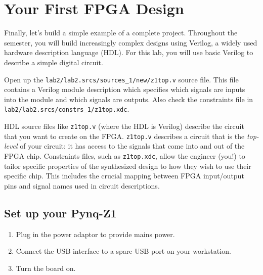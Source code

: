 \documentclass[11pt]{article}
\begin{document}
\section{Your First FPGA Design}
Finally, let's build a simple example of a complete project. Throughout the semester, you will build increasingly complex designs using Verilog, a widely used hardware description language (HDL). For this lab, you will use basic Verilog to describe a simple digital circuit.

Open up the \verb|lab2/lab2.srcs/sources_1/new/z1top.v| source file.
This file contains a Verilog module description which specifies which signals are inputs into the module and which signals are outputs.
Also check the constraints file in \verb|lab2/lab2.srcs/constrs_1/z1top.xdc|.



HDL source files like \verb|z1top.v| (where the HDL is Verilog) describe the circuit that you want to create on the FPGA.
\verb|z1top.v| describes a circuit that is the \emph{top-level} of your circuit: it has access to the signals that come into and out of the FPGA chip.
Constraints files, such as \verb|z1top.xdc|, allow the engineer (you!) to tailor specific properties of the synthesized design to how they wish to use their specific chip. This includes the crucial mapping between FPGA input/output pins and signal names used in circuit descriptions.

\subsection{Set up your Pynq-Z1}
\begin{enumerate}
  \item Plug in the power adaptor to provide mains power.
  \item Connect the USB interface to a spare USB port on your workstation.
  \item Turn the board on.
\end{enumerate}
\end{document}
